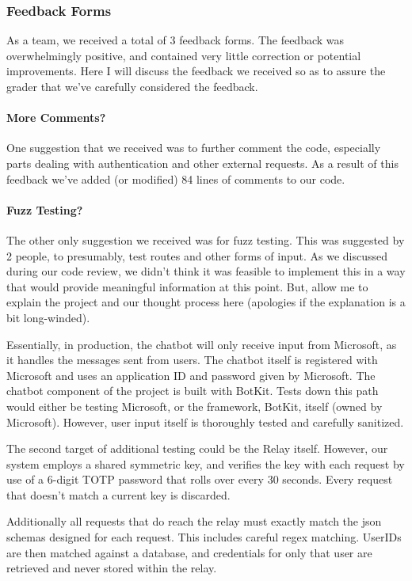 \documentclass[onecolumn, draftclsnofoot,10pt, compsoc]{IEEEtran}
\begin{document}
\subsubsection{Feedback Forms}
As a team, we received a total of 3 feedback forms.
The feedback was overwhelmingly positive, and contained very little correction or potential improvements.
Here I will discuss the feedback we received so as to assure the grader that we've carefully considered the feedback.
\paragraph{More Comments?}
One suggestion that we received was to further comment the code, especially parts dealing with authentication and other external requests.
As a result of this feedback we've added (or modified) 84 lines of comments to our code.
\paragraph{Fuzz Testing?}
The other only suggestion we received was for fuzz testing.
This was suggested by 2 people, to presumably, test routes and other forms of input.
As we discussed during our code review, we didn't think it was feasible to implement this in a way that would provide meaningful information at this point.
But, allow me to explain the project and our thought process here (apologies if the explanation is a bit long-winded).

Essentially, in production, the chatbot will only receive input from Microsoft, as it handles the messages sent from users.
The chatbot itself is registered with Microsoft and uses an application ID and password given by Microsoft.
The chatbot component of the project is built with BotKit.
Tests down this path would either be testing Microsoft, or the framework, BotKit, itself (owned by Microsoft).
However, user input itself is thoroughly tested and carefully sanitized.

The second target of additional testing could be the Relay itself.
However, our system employs a shared symmetric key, and verifies the key with each request by use of a 6-digit TOTP password that rolls over every 30 seconds.
Every request that doesn't match a current key is discarded.

Additionally all requests that do reach the relay must exactly match the json schemas designed for each request. This includes careful regex matching.
UserIDs are then matched against a database, and credentials for only that user are retrieved and never stored within the relay.
\end{document}

